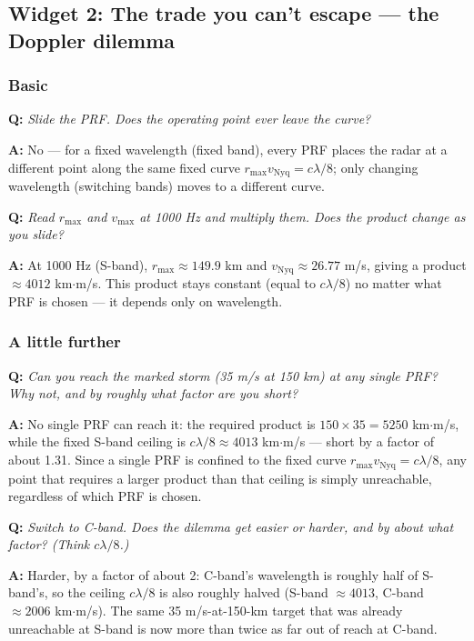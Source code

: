 \documentclass[11pt]{article}
\newenvironment{qa}[1]{\par\noindent\textbf{\color{qgray}Q: }\emph{#1}\par\noindent\textbf{A: }}{\par\vspace{6pt}}
\newcommand{\tier}[1]{\subsubsection*{#1}}
\begin{document}
\subsection{Widget 2: The trade you can't escape --- the Doppler dilemma}

\tier{Basic}
\begin{qa}{Slide the PRF. Does the operating point ever leave the curve?}
No --- for a fixed wavelength (fixed band), every PRF places the radar at a different point along the same fixed curve $r_{\max}v_{\mathrm{Nyq}}=c\lambda/8$; only changing wavelength (switching bands) moves to a different curve.
\end{qa}
\begin{qa}{Read $r_{\max}$ and $v_{\max}$ at 1000 Hz and multiply them. Does the product change as you slide?}
At 1000 Hz (S-band), $r_{\max}\approx149.9$ km and $v_{\mathrm{Nyq}}\approx26.77$ m/s, giving a product $\approx4012$ km$\cdot$m/s. This product stays constant (equal to $c\lambda/8$) no matter what PRF is chosen --- it depends only on wavelength.
\end{qa}

\tier{A little further}
\begin{qa}{Can you reach the marked storm (35 m/s at 150 km) at \emph{any} single PRF? Why not, and by roughly what factor are you short?}
No single PRF can reach it: the required product is $150\times35=5250$ km$\cdot$m/s, while the fixed S-band ceiling is $c\lambda/8\approx4013$ km$\cdot$m/s --- short by a factor of about 1.31. Since a single PRF is confined to the fixed curve $r_{\max}v_{\mathrm{Nyq}}=c\lambda/8$, any point that requires a larger product than that ceiling is simply unreachable, regardless of which PRF is chosen.
\end{qa}
\begin{qa}{Switch to C-band. Does the dilemma get easier or harder, and by about what factor? (Think $c\lambda/8$.)}
Harder, by a factor of about 2: C-band's wavelength is roughly half of S-band's, so the ceiling $c\lambda/8$ is also roughly halved (S-band $\approx4013$, C-band $\approx2006$ km$\cdot$m/s). The same 35 m/s-at-150-km target that was already unreachable at S-band is now more than twice as far out of reach at C-band.
\end{qa}
\end{document}
